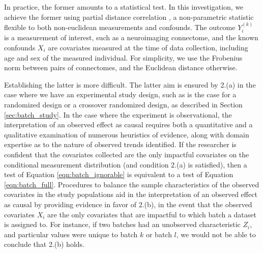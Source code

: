 In practice, the former amounts to a statistical test. In this investigation, we achieve the former using partial distance correlation \cite{Szekely2014Dec}, a non-parametric statistic flexible to both non-euclidean measurements and confounds. The outcome $Y_i^{(k)}$ is a measurement of interest, such as a neuroimaging connectome, and the known confounds $X_i$ are covariates measured at the time of data collection, including age and sex of the measured individual.
For simplicity, we use the Frobenius norm between pairs of connectomes, and the Euclidean distance otherwise.

Establishing the latter is more difficult. The latter aim is ensured by 2.(a) in the case where we have an experimental study design, such as is the case for a randomized design or a crossover randomized design, as described in Section \ref{sec:batch_study}. 
In the case where the experiment is observational, the interpretation of an observed effect as causal requires both a quantitative and a qualitative examination of numerous heuristics of evidence, along with domain expertise as to the nature of observed trends identified. If the researcher is confident that the covariates collected are the only impactful covariates on the conditional measurement distribution (and condition 2.(a) is satisfied), then a test of Equation \ref{eqn:batch_ignorable} is equivalent to a test of Equation \ref{eqn:batch_full}. Procedures to balance the sample characteristics of the observed covariates in the study populations aid in the interpretation of an observed effect as causal by providing evidence in favor of 2.(b), in the event that the observed covariates $X_i$ are the only covariates that are impactful to which batch a dataset is assigned to. For instance, if two batches had an unobserved characteristic $Z_i$, and particular values were unique to batch $k$ or batch $l$, we would not be able to conclude that 2.(b) holds.

